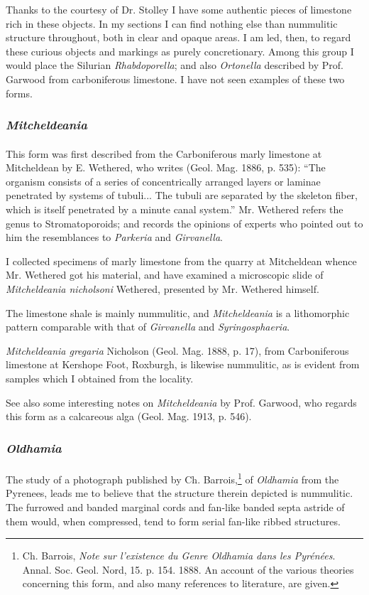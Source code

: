 \documentclass[a4paper, 12pt, oneside]{article}
\begin{document}
Thanks to the courtesy of Dr. Stolley I have some authentic pieces of limestone rich in these objects. In my sections I can find nothing else than nummulitic structure throughout, both in clear and opaque areas. I am led, then, to regard these curious objects and markings as purely concretionary. Among this group I would place the Silurian \emph{Rhabdoporella}; and also \emph{Ortonella} described by Prof. Garwood from carboniferous limestone. I have not seen examples of these two forms.

\subsubsection{\emph{Mitcheldeania}}
\paragraph{}
This form was first described from the Carboniferous marly limestone at Mitcheldean by E. Wethered, who writes (Geol. Mag. 1886, p. 535): ``The organism consists of a series of concentrically arranged layers or laminae penetrated by systems of tubuli... The tubuli are separated by the skeleton fiber, which is itself penetrated by a minute canal system.'' Mr. Wethered refers the genus to Stromatoporoids; and records the opinions of experts who pointed out to him the resemblances to \emph{Parkeria} and \emph{Girvanella}.

I collected specimens of marly limestone from the quarry at Mitcheldean whence Mr. Wethered got his material, and have examined a microscopic slide of \emph{Mitcheldeania nicholsoni} Wethered, presented by Mr. Wethered himself.

The limestone shale is mainly nummulitic, and \emph{Mitcheldeania} is a lithomorphic pattern comparable with that of \emph{Girvanella} and \emph{Syringosphaeria}.

\emph{Mitcheldeania gregaria} Nicholson (Geol. Mag. 1888, p. 17), from Carboniferous limestone at Kershope Foot, Roxburgh, is likewise nummulitic, as is evident from samples which I obtained from the locality.

See also some interesting notes on \emph{Mitcheldeania} by Prof. Garwood, who regards this form as a calcareous alga (Geol. Mag. 1913, p. 546).

\subsubsection{\emph{Oldhamia}}
\paragraph{}
The study of a photograph published by Ch. Barrois,\footnote{Ch. Barrois, \emph{Note sur l'existence du Genre \emph{Oldhamia} dans les Pyrénées}. Annal. Soc. Geol. Nord, 15. p. 154. 1888. An account of the various theories concerning this form, and also many references to literature, are given.} of \emph{Oldhamia} from the Pyrenees, leads me to believe that the structure therein depicted is nummulitic. The furrowed and banded marginal cords and fan-like banded septa astride of them would, when compressed, tend to form serial fan-like ribbed structures.
\end{document}
